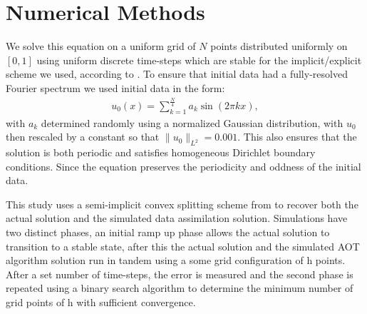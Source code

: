\documentclass[12pt]{amsart}
\theoremstyle{plain}
\theoremstyle{definition}
\theoremstyle{remark}
\numberwithin{equation}{section} %
\numberwithin{figure}{section}   %
\begin{document}
%
 
 \section{Numerical Methods}\label{secNum}
We solve this equation on a uniform grid of $N$ points distributed uniformly on $\left[0,1\right]$ using uniform discrete time-steps which are stable for the implicit/explicit scheme we used, according to \cite{Eyre_1997}. To ensure that initial data had a fully-resolved Fourier spectrum we used initial data in the form:
\begin{align}\label{initial_data}
u_0(x) = \sum_{k=1}^{\frac{N}{4}}a_k\sin(2\pi kx),
\end{align}
with $a_k$ determined randomly using a normalized Gaussian distribution, with $u_0$ then rescaled by a constant so that $\|u_0\|_{L^2}=0.001$. This also ensures that the solution is both periodic and satisfies homogeneous Dirichlet boundary conditions. Since the equation preserves the periodicity and oddness of the initial data.

This study uses a semi-implicit convex splitting scheme from \cite{Eyre_1997,Eyre_1998} to recover both the actual solution and the simulated data assimilation solution. Simulations have two distinct phases, an initial ramp up phase allows the actual solution to transition to a stable state, after this the actual solution and the simulated AOT algorithm solution run in tandem using a some grid configuration of h points. After a set number of time-steps, the error is measured and the second phase is repeated using a binary search algorithm to determine the minimum number of grid points of h with sufficient convergence.  
\end{document}
